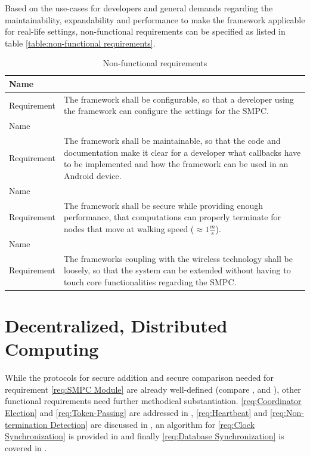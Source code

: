 Based on the use-cases for developers and general demands regarding the maintainability, expandability and performance to make the framework applicable for real-life settings, non-functional requirements can be specified as listed in table \ref{table:non-functional requirements}.

\begin{table}[!htb] %
	\centering
	\caption{Non-functional requirements} \label{table:non-functional requirements}
	\begin{tabular}{|l|p{}|}
		\hline
		Name & \nonfuncreq{Usability}\label{req:Usability} \\ \hline
		Requirement & The framework shall be configurable, so that a developer using the framework can configure the settings for the \gls{SMPC}. \\ \hline
		Name & \nonfuncreq{Maintainability}\label{req:Supportability} \\ \hline
		Requirement & The framework shall be maintainable, so that the code and documentation make it clear for a developer what callbacks have to be implemented and how the framework can be used in an Android device. \\ \hline
		Name & \nonfuncreq{Performance}\label{req:Performance} \\ \hline
		Requirement & The framework shall be secure while providing enough performance, that computations can properly terminate for nodes that move at walking speed ($\approx1\frac{m}{s}$). \\ \hline
		Name & \nonfuncreq{Expandability}\label{req:Expandability} \\ \hline
		Requirement & The frameworks coupling with the wireless technology shall be loosely, so that the system can be extended without having to touch core functionalities regarding the \gls{SMPC}.  \\ \hline
	\end{tabular}
\end{table}

\section{Decentralized, Distributed Computing} \label{Decentralized, Distributed Computing}

While the protocols for secure addition and secure comparison needed for requirement \ref{req:SMPC Module} are already well-defined (compare ,  and ), other functional requirements need further methodical substantiation. \ref{req:Coordinator Election} and \ref{req:Token-Passing} are addressed in , \ref{req:Heartbeat} and \ref{req:Non-termination Detection} are discussed in , an algorithm for \ref{req:Clock Synchronization} is provided in  and finally \ref{req:Database Synchronization} is covered in .

